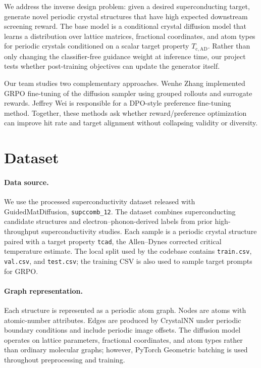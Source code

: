 \documentclass{article}
\newcommand{\Tcad}{T_{\mathrm{c,AD}}}
\begin{document}
We address the inverse design problem: given a desired superconducting target, generate novel periodic crystal structures that have high expected downstream screening reward. The base model is a conditional crystal diffusion model that learns a distribution over lattice matrices, fractional coordinates, and atom types for periodic crystals conditioned on a scalar target property $\Tcad$. Rather than only changing the classifier-free guidance weight at inference time, our project tests whether post-training objectives can update the generator itself.

Our team studies two complementary approaches. Wenhe Zhang implemented GRPO fine-tuning of the diffusion sampler using grouped rollouts and surrogate rewards. Jeffrey Wei is responsible for a DPO-style preference fine-tuning method. Together, these methods ask whether reward/preference optimization can improve hit rate and target alignment without collapsing validity or diversity.

\section{Dataset}
\paragraph{Data source.}
We use the processed superconductivity dataset released with GuidedMatDiffusion, \texttt{supccomb\_12}. The dataset combines superconducting candidate structures and electron--phonon-derived labels from prior high-throughput superconductivity studies. Each sample is a periodic crystal structure paired with a target property \texttt{tcad}, the Allen--Dynes corrected critical temperature estimate. The local split used by the codebase contains \texttt{train.csv}, \texttt{val.csv}, and \texttt{test.csv}; the training CSV is also used to sample target prompts for GRPO.

\paragraph{Graph representation.}
Each structure is represented as a periodic atom graph. Nodes are atoms with atomic-number attributes. Edges are produced by CrystalNN under periodic boundary conditions and include periodic image offsets. The diffusion model operates on lattice parameters, fractional coordinates, and atom types rather than ordinary molecular graphs; however, PyTorch Geometric batching is used throughout preprocessing and training.
\end{document}

